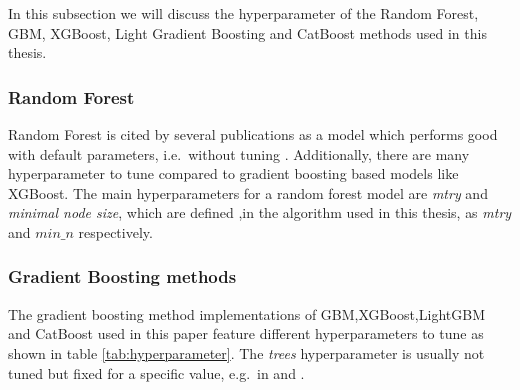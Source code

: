 \documentclass[12pt,a4paper]{article}
\begin{document}
In this subsection we will discuss the hyperparameter of the Random Forest, GBM, XGBoost, Light Gradient Boosting and CatBoost methods used in this thesis.

\hypertarget{random-forest}{%
\subsubsection{Random Forest}\label{random-forest}}

Random Forest is cited by several publications as a model which performs good with default parameters, i.e.~without tuning \textcite{Shahhosseini2019}. Additionally, there are many hyperparameter to tune compared to gradient boosting based models like XGBoost.
The main hyperparameters for a random forest model are \textit{mtry} and \textit{minimal node size}, which are defined ,in the algorithm used in this thesis, as \textit{mtry} and \(min\_n\) respectively.

\hypertarget{gradient-boosting-methods}{%
\subsubsection{Gradient Boosting methods}\label{gradient-boosting-methods}}

The gradient boosting method implementations of GBM,XGBoost,LightGBM and CatBoost used in this paper feature different hyperparameters to tune as shown in table \ref{tab:hyperparameter}.
The \textit{trees} hyperparameter is usually not tuned but fixed for a specific value, e.g.~in \textcite{Wang2020} and \textcite{Karetnikov2019}.
\end{document}
